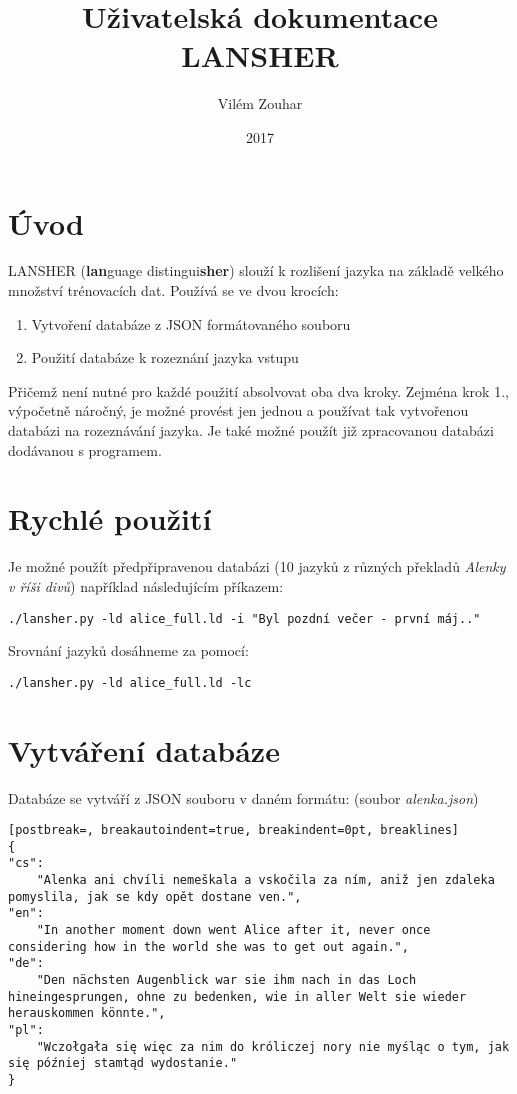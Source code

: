 \documentclass[11pt]{article}
\title{\textbf{Uživatelská dokumentace LANSHER }}
\author{Vilém Zouhar}
\date{2017}
\begin{document}
\maketitle

\section{Úvod} 
LANSHER (\textbf{lan}guage distingui\textbf{sher}) slouží k rozlišení jazyka na základě velkého množství trénovacích dat. Používá se ve dvou krocích:

\begin{enumerate}
\item Vytvoření databáze z JSON formátovaného souboru
\item Použití databáze k rozeznání jazyka vstupu
\end{enumerate}

Přičemž není nutné pro každé použití absolvovat oba dva kroky. Zejména krok 1., výpočetně náročný, je možné provést jen jednou a používat tak vytvořenou databázi na rozeznávání jazyka. Je také možné použít již zpracovanou databázi dodávanou s programem.

\section{Rychlé použití}
Je možné použít předpřipravenou databázi (10 jazyků z různých překladů \textit{Alenky v říši divů}) například následujícím příkazem:

\begin{lstlisting}
./lansher.py -ld alice_full.ld -i "Byl pozdní večer - první máj.."
\end{lstlisting}

Srovnání jazyků dosáhneme za pomocí:


\begin{lstlisting}
./lansher.py -ld alice_full.ld -lc
\end{lstlisting}

\section{Vytváření databáze}
Databáze se vytváří z JSON souboru v daném formátu: (soubor \textit{alenka.json})
\begin{lstlisting}[postbreak=, breakautoindent=true, breakindent=0pt, breaklines]
{
"cs":
	"Alenka ani chvíli nemeškala a vskočila za ním, aniž jen zdaleka pomyslila, jak se kdy opět dostane ven.",
"en": 
	"In another moment down went Alice after it, never once considering how in the world she was to get out again.",
"de":
	"Den nächsten Augenblick war sie ihm nach in das Loch hineingesprungen, ohne zu bedenken, wie in aller Welt sie wieder herauskommen könnte.",
"pl":
	"Wczołgała się więc za nim do króliczej nory nie myśląc o tym, jak się później stamtąd wydostanie."
}
\end{lstlisting}
\end{document}
